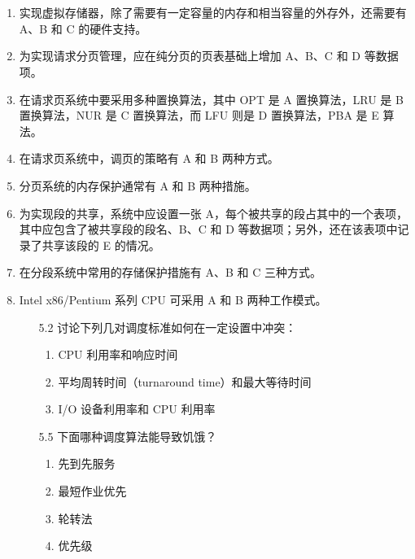 \documentclass[UTF8]{ctexart}
\begin{document}
\section{}
\begin{enumerate}
	\item 实现虚拟存储器，除了需要有一定容量的内存和相当容量的外存外，还需要有 A、B 和 C 的硬件支持。
	
	\item 为实现请求分页管理，应在纯分页的页表基础上增加 A、B、C 和 D 等数据项。
	
	\item 在请求页系统中要采用多种置换算法，其中 OPT 是 A 置换算法，LRU 是 B 置换算法，NUR 是 C 置换算法，而 LFU 则是 D 置换算法，PBA 是 E 算法。
	
	\item 在请求页系统中，调页的策略有 A 和 B 两种方式。
	
	\item 分页系统的内存保护通常有 A 和 B 两种措施。
	
	\item 为实现段的共享，系统中应设置一张 A，每个被共享的段占其中的一个表项，其中应包含了被共享段的段名、B、C 和 D 等数据项；另外，还在该表项中记录了共享该段的 E 的情况。
	
	\item 在分段系统中常用的存储保护措施有 A、B 和 C 三种方式。
	
	\item Intel x86/Pentium 系列 CPU 可采用 A 和 B 两种工作模式。
	
	\begin{enumerate}
		\item[5.2] 讨论下列几对调度标准如何在一定设置中冲突：
		\begin{enumerate}
			\item CPU 利用率和响应时间
			\item 平均周转时间（turnaround time）和最大等待时间
			\item I/O 设备利用率和 CPU 利用率
		\end{enumerate}
		
		\item[5.5] 下面哪种调度算法能导致饥饿？
		\begin{enumerate}
			\item 先到先服务
			\item 最短作业优先
			\item 轮转法
			\item 优先级
		\end{enumerate}
		

\end{enumerate}
\end{enumerate}
\end{document}
